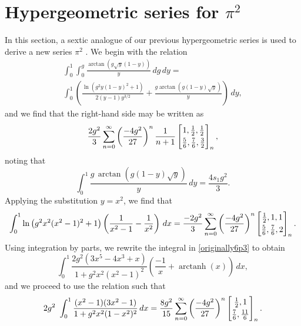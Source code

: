 \documentclass[12pt]{article}
\begin{document}
\section{Hypergeometric series for $\pi^2$}
 In this section, a sextic analogue of our previous hypergeometric series is used to derive a new series {$\pi^{2}$ }. We begin 
 with the relation 
\begin{multline*}
 \int_{0}^{1} \int_{0}^{g} \frac{\arctan\left(g \sqrt{y} (1-y)\right)}{y} \, dg \, dy = \\
 \int_{0}^{1} \left( \frac{\ln\left(g^2 y (1 - y)^2 + 1\right)}{2 (y - 1) y^{3/2}} + 
 \frac{g \operatorname{arctan}\left(g (1 - y) \sqrt{y}\right)}{y} \right) \, dy, 
\end{multline*}
 and we find that the right-hand side may be written as 
 $$ \frac{2g^2}{3} \sum_{n=0}^{\infty} \left( \frac{-4g^2}{27} \right)^{n} 
 \frac{1}{n+1} 
 \left[ \begin{matrix} 1, \frac{1}{2}, \frac{1}{2} 
 \vspace{1mm} \\ 
 \frac{5}{6}, \frac{7}{6}, \frac{3}{2} \end{matrix} \right]_{n}, $$ 
 noting that 
\begin{equation*}
 \int_{0}^{1}\frac{g \, \operatorname{arctan}\left(g (1 - y) \sqrt{y}\right)}{y} \, dy=\frac{4s_1g^2}{3}. 
\end{equation*}
 Applying the substitution $y=x^2$, we find that 
\begin{equation}\label{originally6p3}
 \int_{0}^{1} \ln\left(g^2x^2 (x^2-1)^2 +1 \right) \left(\frac{1}{x^2 - 1} - \frac{1}{x^2}\right) \, dx= 
 \frac{-2g^2}{3} \sum_{n=0}^{\infty} \left( \frac{-4g^2}{27} \right)^{n} 
 \left[ \begin{matrix} \frac{1}{2}, 1, 1 
 \vspace{1mm} \\ 
 \frac{5}{6}, \frac{7}{6}, 2 \end{matrix} \right]_{n}. 
\end{equation}
 Using integration by parts, we rewrite the integral in \eqref{originally6p3} to obtain 
\begin{equation*}
\int_{0}^{1} \frac{2g^2 \left(3x^5 - 4x^3 + x\right)}{1 + g^2x^2(x^2-1)^2} \left(\frac{-1}{x} + 
 \operatorname{arctanh}(x)\right)\, dx, 
\end{equation*}
 and we proceed to use the relation such that 
\begin{equation*}
 2g^2\ \int_{0}^{1} \frac{(x^2 - 1)(3x^2 - 1)}{1 + g^2x^2(1 - x^2)^2} \, dx = 
 \frac{8g^2}{15} \sum_{n=0}^{\infty} \left( \frac{-4g^2}{27} \right)^{n} 
 \left[ \begin{matrix} \frac{1}{2}, 1 
 \vspace{1mm} \\ 
 \frac{7}{6}, \frac{11}{6} \end{matrix} \right]_{n}. 
\end{equation*}
\end{document}
